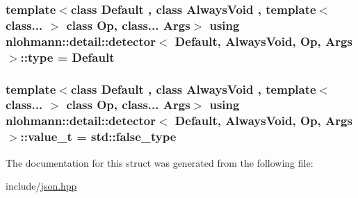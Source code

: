 \subsubsection[{\texorpdfstring{type}{type}}]{\setlength{\rightskip}{0pt plus 5cm}template$<$class Default , class Always\+Void , template$<$ class... $>$ class Op, class... Args$>$ using {\bf nlohmann\+::detail\+::detector}$<$ Default, Always\+Void, Op, Args $>$\+::{\bf type} =  Default}\hypertarget{structnlohmann_1_1detail_1_1detector_a0cd69423587748bf3d3d702cc7b7c2ce}{}\label{structnlohmann_1_1detail_1_1detector_a0cd69423587748bf3d3d702cc7b7c2ce}
\subsubsection[{\texorpdfstring{value\+\_\+t}{value_t}}]{\setlength{\rightskip}{0pt plus 5cm}template$<$class Default , class Always\+Void , template$<$ class... $>$ class Op, class... Args$>$ using {\bf nlohmann\+::detail\+::detector}$<$ Default, Always\+Void, Op, Args $>$\+::{\bf value\+\_\+t} =  std\+::false\+\_\+type}\hypertarget{structnlohmann_1_1detail_1_1detector_a5a132aab543d1706e2439268faf8d487}{}\label{structnlohmann_1_1detail_1_1detector_a5a132aab543d1706e2439268faf8d487}


The documentation for this struct was generated from the following file\+:\begin{DoxyCompactItemize}
\item 
include/\hyperlink{json_8hpp}{json.\+hpp}\end{DoxyCompactItemize}
